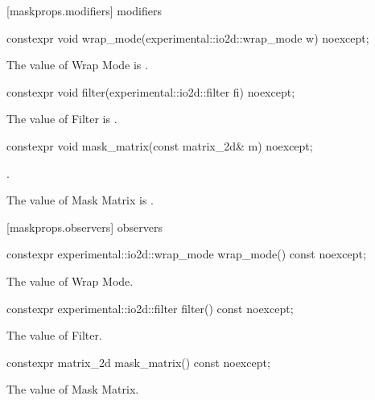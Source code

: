 [maskprops.modifiers] { modifiers}

\begin{itemdecl}
constexpr void wrap_mode(experimental::io2d::wrap_mode w) noexcept;
\end{itemdecl}
\begin{itemdescr}
\pnum
\effects
The value of Wrap Mode is .
\end{itemdescr}

\begin{itemdecl}
constexpr void filter(experimental::io2d::filter fi) noexcept;
\end{itemdecl}
\begin{itemdescr}
\pnum
\effects
The value of Filter is .
\end{itemdescr}

\begin{itemdecl}
constexpr void mask_matrix(const matrix_2d& m) noexcept;
\end{itemdecl}
\begin{itemdescr}
\pnum
\preconditions
{}.

\pnum
\effects
The value of Mask Matrix is .
\end{itemdescr}

 [maskprops.observers] { observers}

\begin{itemdecl}
constexpr experimental::io2d::wrap_mode wrap_mode() const noexcept;
\end{itemdecl}
\begin{itemdescr}
\pnum
\returns
The value of Wrap Mode.
\end{itemdescr}

\begin{itemdecl}
constexpr experimental::io2d::filter filter() const noexcept;
\end{itemdecl}
\begin{itemdescr}
\pnum
\returns
The value of Filter.
\end{itemdescr}

\begin{itemdecl}
constexpr matrix_2d mask_matrix() const noexcept;
\end{itemdecl}
\begin{itemdescr}
\pnum
\returns
The value of Mask Matrix.
\end{itemdescr}
